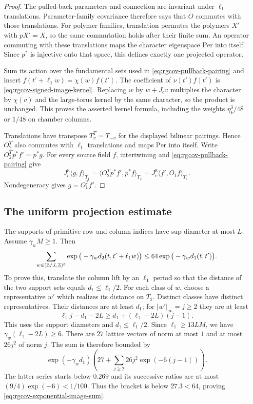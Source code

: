 \begin{proof}
The pulled-back parameters and connection are invariant
under $\ell_1$ translations. Parameter-family covariance
therefore says that $\widetilde O$ commutes with those
translations. For polymer families, translation permutes
the polymers $X'$ with $pX'=X$, so the same commutation
holds after their finite sum.
An operator commuting with these translations maps the
character eigenspace $\mathrm{Per}$ into itself.
Since $p^*$ is injective onto that space, this defines
exactly one projected operator.

Sum its action over the fundamental sets used in
\eqref{eq:rgcov-pullback-pairing} and insert
$f(t'+\ell_1w)=\chi(w)f(t')$.
The coefficient of $\nu(t')f(t')$ is
\eqref{eq:rgcov-signed-image-kernel}.
Replacing $w$ by $w+J_cv$ multiplies the character
by $\chi(v)$ and the large-torus kernel by the same
character, so the product is unchanged.
This proves the asserted kernel formula, including
the weights $\eta_k^3/48$ or $1/48$ on chamber columns.

Translations have transpose $T_v^T=T_{-v}$ for the
displayed bilinear pairings. Hence $O_2^T$ also commutes
with $\ell_1$ translations and maps $\mathrm{Per}$
into itself. Write $O_2^Tp^*f'=p^*g$.
For every source field $f$, intertwining and
\eqref{eq:rgcov-pullback-pairing} give
\[
 J_c^3\langle g,f\rangle_{T_1}
 =\langle O_2^Tp^*f',p^*f\rangle_{T_2}
 =J_c^3\langle f',O_1f\rangle_{T_1}.
\]
Nondegeneracy gives $g=O_1^Tf'$.
\end{proof}

\subsection{The uniform projection estimate}
\label{subsec:rgcov-projection-estimates}

The supports of primitive row and column indices have
sup diameter at most $L$. Assume
$\gamma_wM\ge1$. Then
\begin{equation}\label{eq:rgcov-exponential-image-sum}
 \sum_{w\in(\mathbb Z/J_c\mathbb Z)^3}
     \exp\big(-\gamma_wd_2(t,t'+\ell_1w)\big)
                     \le64\exp\big(-\gamma_wd_1(t,t')\big).
\end{equation}
To prove this, translate the column lift by an
$\ell_1$ period so that the distance of the two support
sets equals $d_1\le\ell_1/2$.
For each class of $w$, choose a representative $w'$
which realizes its distance on $T_2$. Distinct classes
have distinct representatives. Their distances are
at least $d_1$; for $|w'|_\infty=j\ge2$ they are at least
\[
 \ell_1j-d_1-2L
                         \ge d_1+(\ell_1-2L)(j-1).
\]
This uses the support diameters and $d_1\le\ell_1/2$.
Since $\ell_1\ge13LM$, we have
$\gamma_w(\ell_1-2L)\ge6$.
There are $27$ lattice vectors of norm at most $1$
and at most $26j^2$ of norm $j$.
The sum is therefore bounded by
\[
 \exp(-\gamma_wd_1)
                 \left(27+\sum_{j\ge2}26j^2\exp(-6(j-1))\right).
\]
The latter series starts below $0.269$ and its
successive ratios are at most
$(9/4)\exp(-6)<1/100$. Thus the bracket is below
$27.3<64$, proving \eqref{eq:rgcov-exponential-image-sum}.

